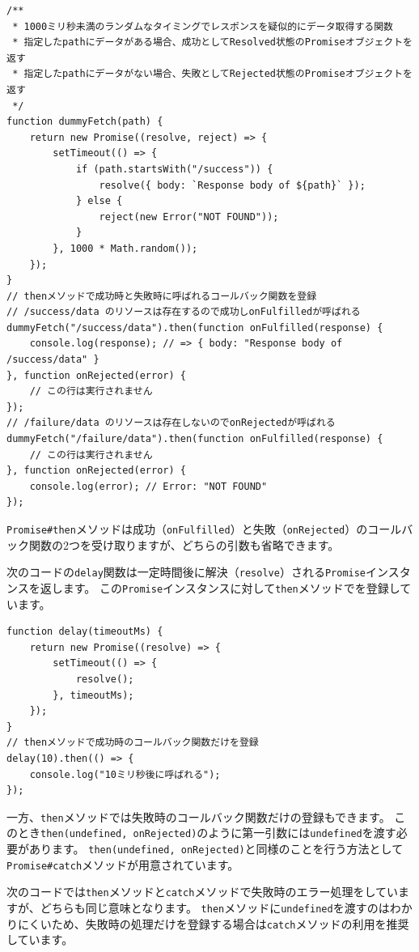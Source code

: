 \begin{lstlisting}
/**
 * 1000ミリ秒未満のランダムなタイミングでレスポンスを疑似的にデータ取得する関数
 * 指定したpathにデータがある場合、成功としてResolved状態のPromiseオブジェクトを返す
 * 指定したpathにデータがない場合、失敗としてRejected状態のPromiseオブジェクトを返す
 */
function dummyFetch(path) {
    return new Promise((resolve, reject) => {
        setTimeout(() => {
            if (path.startsWith("/success")) {
                resolve({ body: `Response body of ${path}` });
            } else {
                reject(new Error("NOT FOUND"));
            }
        }, 1000 * Math.random());
    });
}
// thenメソッドで成功時と失敗時に呼ばれるコールバック関数を登録
// /success/data のリソースは存在するので成功しonFulfilledが呼ばれる
dummyFetch("/success/data").then(function onFulfilled(response) {
    console.log(response); // => { body: "Response body of /success/data" }
}, function onRejected(error) {
    // この行は実行されません
});
// /failure/data のリソースは存在しないのでonRejectedが呼ばれる
dummyFetch("/failure/data").then(function onFulfilled(response) {
    // この行は実行されません
}, function onRejected(error) {
    console.log(error); // Error: "NOT FOUND"
});
\end{lstlisting}

\texttt{Promise\#then}メソッドは成功（\texttt{onFulfilled}）と失敗（\texttt{onRejected}）のコールバック関数の2つを受け取りますが、どちらの引数も省略できます。

次のコードの\texttt{delay}関数は一定時間後に解決（\texttt{resolve}）される\texttt{Promise}インスタンスを返します。
この\texttt{Promise}インスタンスに対して\texttt{then}メソッドで\textbf{}を登録しています。

\begin{lstlisting}
function delay(timeoutMs) {
    return new Promise((resolve) => {
        setTimeout(() => {
            resolve();
        }, timeoutMs);
    });
}
// thenメソッドで成功時のコールバック関数だけを登録
delay(10).then(() => {
    console.log("10ミリ秒後に呼ばれる");
});
\end{lstlisting}

一方、\texttt{then}メソッドでは失敗時のコールバック関数だけの登録もできます。
このとき\texttt{then(undefined, onRejected)}のように第一引数には\texttt{undefined}を渡す必要があります。
\texttt{then(undefined, onRejected)}と同様のことを行う方法として\texttt{Promise\#catch}メソッドが用意されています。

次のコードでは\texttt{then}メソッドと\texttt{catch}メソッドで失敗時のエラー処理をしていますが、どちらも同じ意味となります。
\texttt{then}メソッドに\texttt{undefined}を渡すのはわかりにくいため、失敗時の処理だけを登録する場合は\texttt{catch}メソッドの利用を推奨しています。

